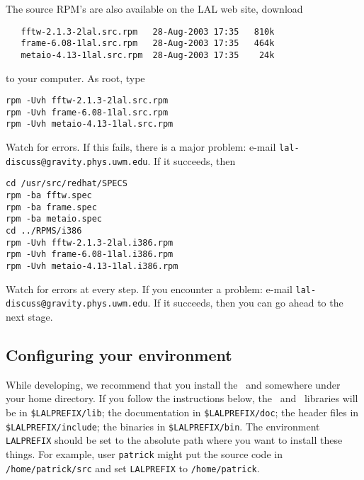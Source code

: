 The source RPM's are also available on the LAL web site,   download
\begin{verbatim}
   fftw-2.1.3-2lal.src.rpm   28-Aug-2003 17:35   810k  
   frame-6.08-1lal.src.rpm   28-Aug-2003 17:35   464k  
   metaio-4.13-1lal.src.rpm  28-Aug-2003 17:35    24k  
\end{verbatim}
to your computer.  As root,   type
\begin{verbatim}
rpm -Uvh fftw-2.1.3-2lal.src.rpm
rpm -Uvh frame-6.08-1lal.src.rpm
rpm -Uvh metaio-4.13-1lal.src.rpm
\end{verbatim}
Watch for errors.  If this fails,  there is a major problem:  e-mail
\verb+lal-discuss@gravity.phys.uwm.edu+.    If it succeeds,  then
\begin{verbatim}
cd /usr/src/redhat/SPECS
rpm -ba fftw.spec
rpm -ba frame.spec
rpm -ba metaio.spec
cd ../RPMS/i386
rpm -Uvh fftw-2.1.3-2lal.i386.rpm
rpm -Uvh frame-6.08-1lal.i386.rpm
rpm -Uvh metaio-4.13-1lal.i386.rpm
\end{verbatim}
Watch for errors at every step.  If you encounter a problem:   e-mail
\verb+lal-discuss@gravity.phys.uwm.edu+.   If it succeeds,  then you
can go ahead to the next stage.

\color{black}
\subsection{Configuring your environment}
\color{black}

While developing,  we recommend that you install the \lal\ and \lalapps
somewhere under your home directory.  If you follow the
instructions below,  the \lal\ and \lalapps\ libraries will be in
\verb+$LALPREFIX/lib+;  the documentation in \verb+$LALPREFIX/doc+; the header
files in \verb+$LALPREFIX/include+; the binaries in \verb+$LALPREFIX/bin+.
The environment \verb+LALPREFIX+ should be set to the absolute path where you
want to install these things.  For example,  user \texttt{patrick} might put
the source code in \verb+/home/patrick/src+ and set \verb+LALPREFIX+ to
\verb+/home/patrick+.

